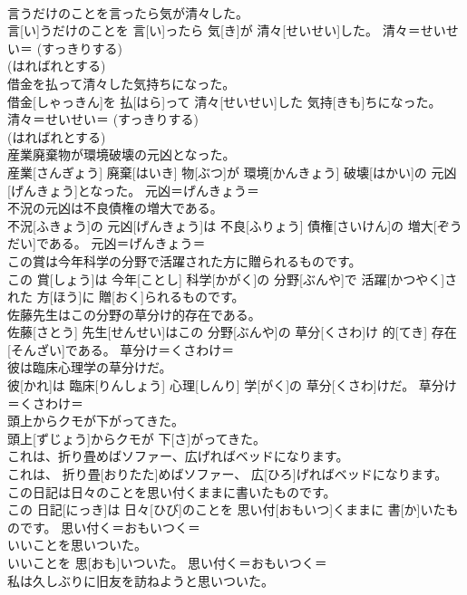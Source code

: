 \documentclass[8pt]{extreport}
\begin{document}
\begin{CJK}{UTF8}{min}
{\\	言うだけのことを言ったら気が清々した。	
\\	言[い]うだけのことを 言[い]ったら 気[き]が 清々[せいせい]した。	清々＝せいせい＝ (すっきりする) 
\\	(はればれとする) 
\\	借金を払って清々した気持ちになった。	
\\	借金[しゃっきん]を 払[はら]って 清々[せいせい]した 気持[きも]ちになった。	清々＝せいせい＝ (すっきりする) 
\\	(はればれとする) 
\\	産業廃棄物が環境破壊の元凶となった。	
\\	産業[さんぎょう] 廃棄[はいき] 物[ぶつ]が 環境[かんきょう] 破壊[はかい]の 元凶[げんきょう]となった。	元凶＝げんきょう＝ 
\\	不況の元凶は不良債権の増大である。	
\\	不況[ふきょう]の 元凶[げんきょう]は 不良[ふりょう] 債権[さいけん]の 増大[ぞうだい]である。	元凶＝げんきょう＝ 
\\	この賞は今年科学の分野で活躍された方に贈られるものです。	
\\	この 賞[しょう]は 今年[ことし] 科学[かがく]の 分野[ぶんや]で 活躍[かつやく]された 方[ほう]に 贈[おく]られるものです。	
\\	佐藤先生はこの分野の草分け的存在である。	
\\	佐藤[さとう] 先生[せんせい]はこの 分野[ぶんや]の 草分[くさわ]け 的[てき] 存在[そんざい]である。	草分け＝くさわけ＝ 
\\	彼は臨床心理学の草分けだ。	
\\	彼[かれ]は 臨床[りんしょう] 心理[しんり] 学[がく]の 草分[くさわ]けだ。	草分け＝くさわけ＝ 
\\	頭上からクモが下がってきた。	
\\	頭上[ずじょう]からクモが 下[さ]がってきた。	
\\	これは、折り畳めばソファー、広げればベッドになります。	
\\	これは、 折り畳[おりたた]めばソファー、 広[ひろ]げればベッドになります。	
\\	この日記は日々のことを思い付くままに書いたものです。	
\\	この 日記[にっき]は 日々[ひび]のことを 思い付[おもいつ]くままに 書[か]いたものです。	思い付く＝おもいつく＝ 
\\	いいことを思いついた。	
\\	いいことを 思[おも]いついた。	思い付く＝おもいつく＝ 
\\	私は久しぶりに旧友を訪ねようと思いついた。	
}
\end{CJK}
\end{document}
